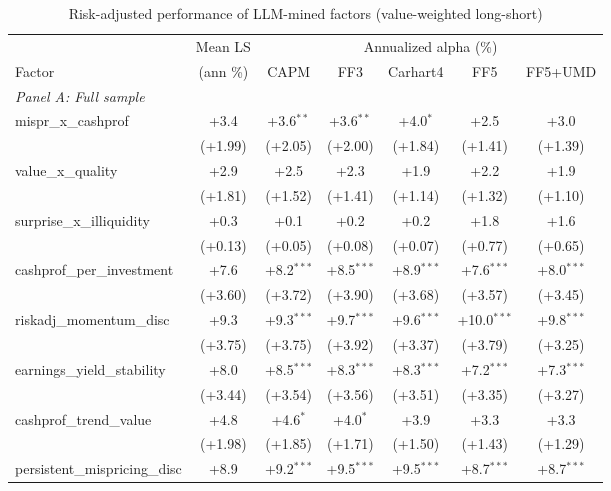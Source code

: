 \begin{table}[htbp]\centering
\caption{Risk-adjusted performance of LLM-mined factors (value-weighted long-short)}
\label{tab:alphas_vw}
\begin{threeparttable}\footnotesize
\begin{tabular}{lcccccc}
\toprule
 & Mean LS & \multicolumn{5}{c}{Annualized alpha (\%)} \\
\cmidrule(lr){3-7}
Factor & (ann \%) & CAPM & FF3 & Carhart4 & FF5 & FF5+UMD \\
\midrule
\multicolumn{7}{l}{\textit{Panel A: Full sample}} \\
\addlinespace
mispr\_x\_cashprof & +3.4 & +3.6$^{**}$ & +3.6$^{**}$ & +4.0$^{*}$ & +2.5 & +3.0 \\
 & (+1.99) & (+2.05) & (+2.00) & (+1.84) & (+1.41) & (+1.39) \\
\addlinespace
value\_x\_quality & +2.9 & +2.5 & +2.3 & +1.9 & +2.2 & +1.9 \\
 & (+1.81) & (+1.52) & (+1.41) & (+1.14) & (+1.32) & (+1.10) \\
\addlinespace
surprise\_x\_illiquidity & +0.3 & +0.1 & +0.2 & +0.2 & +1.8 & +1.6 \\
 & (+0.13) & (+0.05) & (+0.08) & (+0.07) & (+0.77) & (+0.65) \\
\addlinespace
cashprof\_per\_investment & +7.6 & +8.2$^{***}$ & +8.5$^{***}$ & +8.9$^{***}$ & +7.6$^{***}$ & +8.0$^{***}$ \\
 & (+3.60) & (+3.72) & (+3.90) & (+3.68) & (+3.57) & (+3.45) \\
\addlinespace
riskadj\_momentum\_disc & +9.3 & +9.3$^{***}$ & +9.7$^{***}$ & +9.6$^{***}$ & +10.0$^{***}$ & +9.8$^{***}$ \\
 & (+3.75) & (+3.75) & (+3.92) & (+3.37) & (+3.79) & (+3.25) \\
\addlinespace
earnings\_yield\_stability & +8.0 & +8.5$^{***}$ & +8.3$^{***}$ & +8.3$^{***}$ & +7.2$^{***}$ & +7.3$^{***}$ \\
 & (+3.44) & (+3.54) & (+3.56) & (+3.51) & (+3.35) & (+3.27) \\
\addlinespace
cashprof\_trend\_value & +4.8 & +4.6$^{*}$ & +4.0$^{*}$ & +3.9 & +3.3 & +3.3 \\
 & (+1.98) & (+1.85) & (+1.71) & (+1.50) & (+1.43) & (+1.29) \\
\addlinespace
persistent\_mispricing\_disc & +8.9 & +9.2$^{***}$ & +9.5$^{***}$ & +9.5$^{***}$ & +8.7$^{***}$ & +8.7$^{***}$ \\

\end{tabular}
\end{threeparttable}
\end{table}
